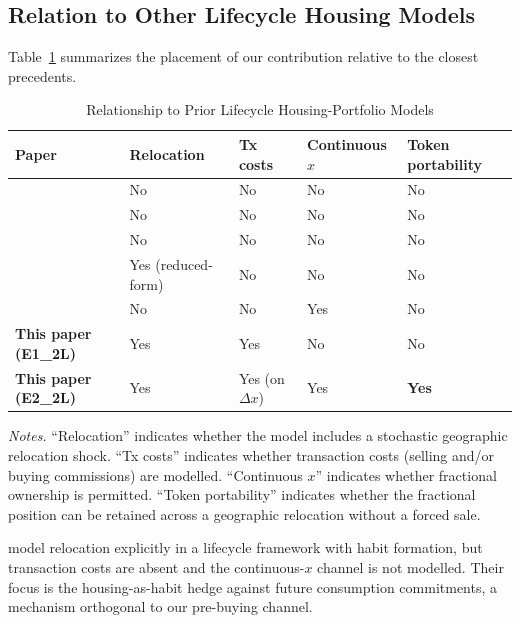 \subsection{Relation to Other Lifecycle Housing Models}
\label{sec:discussion:literature}

Table~\ref{tab:literature} summarizes the placement of our contribution
relative to the closest precedents.

\begin{table}[t]
\centering
\caption{Relationship to Prior Lifecycle Housing-Portfolio Models}
\label{tab:literature}
\small
\begin{tabular}{@{}lllll@{}}
\toprule
Paper & Relocation & Tx costs & Continuous $x$ & Token portability \\
\midrule
\citet{YaoZhang2005}     & No  & No  & No & No \\
\citet{Cocco2005}         & No  & No  & No & No \\
\citet{KraftMunk2011}     & No  & No  & No & No \\
\citet{KMW2018}           & Yes (reduced-form) & No  & No & No \\
\citet{Liu2021}           & No  & No  & Yes & No \\
\textbf{This paper (E1\_2L)} & Yes & Yes & No  & No \\
\textbf{This paper (E2\_2L)} & Yes & Yes (on $\Delta x$) & Yes & \textbf{Yes} \\
\bottomrule
\end{tabular}
\begin{tablenotes}
\footnotesize
\item \textit{Notes.}
``Relocation'' indicates whether the model includes a stochastic
geographic relocation shock.
``Tx costs'' indicates whether transaction costs (selling and/or
buying commissions) are modelled.
``Continuous $x$'' indicates whether fractional ownership is permitted.
``Token portability'' indicates whether the fractional position can be
retained across a geographic relocation without a forced sale.
\end{tablenotes}
\end{table}

\citet{KMW2018} model relocation explicitly in a lifecycle framework with
habit formation, but transaction costs are absent and the continuous-$x$
channel is not modelled.
Their focus is the housing-as-habit hedge against future consumption
commitments, a mechanism orthogonal to our pre-buying channel.


